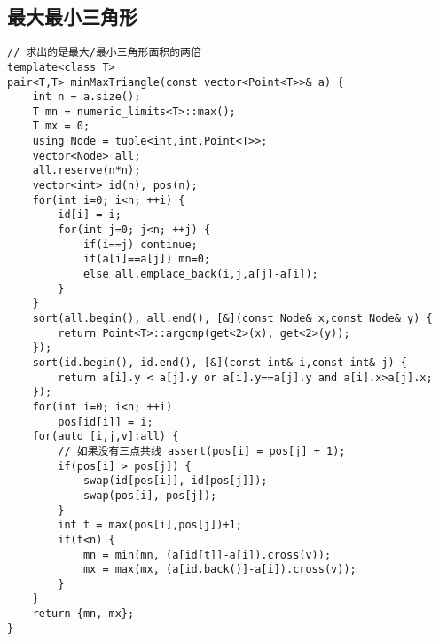 \subsection{最大最小三角形}
\begin{lstlisting}
// 求出的是最大/最小三角形面积的两倍
template<class T>
pair<T,T> minMaxTriangle(const vector<Point<T>>& a) {
    int n = a.size();
    T mn = numeric_limits<T>::max();
    T mx = 0;
    using Node = tuple<int,int,Point<T>>;
    vector<Node> all;
    all.reserve(n*n);
    vector<int> id(n), pos(n);
    for(int i=0; i<n; ++i) {
        id[i] = i;
        for(int j=0; j<n; ++j) {
            if(i==j) continue;
            if(a[i]==a[j]) mn=0;
            else all.emplace_back(i,j,a[j]-a[i]);
        }
    }
    sort(all.begin(), all.end(), [&](const Node& x,const Node& y) {
        return Point<T>::argcmp(get<2>(x), get<2>(y));
    });
    sort(id.begin(), id.end(), [&](const int& i,const int& j) {
        return a[i].y < a[j].y or a[i].y==a[j].y and a[i].x>a[j].x;
    });
    for(int i=0; i<n; ++i)
        pos[id[i]] = i;
    for(auto [i,j,v]:all) {
        // 如果没有三点共线 assert(pos[i] = pos[j] + 1);
        if(pos[i] > pos[j]) {
            swap(id[pos[i]], id[pos[j]]);
            swap(pos[i], pos[j]);
        }
        int t = max(pos[i],pos[j])+1;
        if(t<n) {
            mn = min(mn, (a[id[t]]-a[i]).cross(v));
            mx = max(mx, (a[id.back()]-a[i]).cross(v));
        }
    }
    return {mn, mx};
}
\end{lstlisting}

